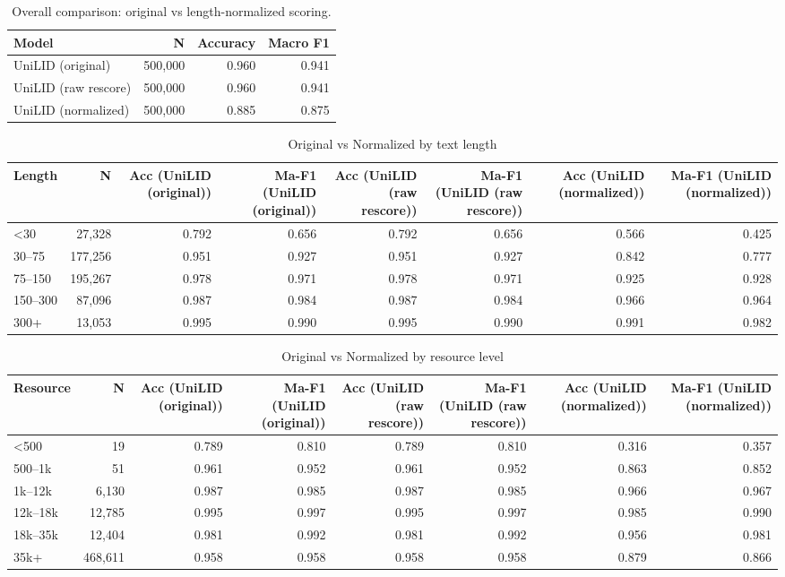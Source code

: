\begin{table}[htbp]
\centering
\small
\begin{tabular}{lrrr}
\toprule
\textbf{Model} & \textbf{N} & \textbf{Accuracy} & \textbf{Macro F1} \\
\midrule
UniLID (original) & 500,000 & 0.960 & 0.941 \\
UniLID (raw rescore) & 500,000 & 0.960 & 0.941 \\
UniLID (normalized) & 500,000 & 0.885 & 0.875 \\
\bottomrule
\end{tabular}
\caption{Overall comparison: original vs length-normalized scoring.}
\label{tab:norm-overall}
\end{table}

\begin{table}[htbp]
\centering
\small
\begin{tabular}{lrrrrrrr}
\toprule
\textbf{Length} & \textbf{N} & \textbf{Acc (UniLID (original))} & \textbf{Ma-F1 (UniLID (original))} & \textbf{Acc (UniLID (raw rescore))} & \textbf{Ma-F1 (UniLID (raw rescore))} & \textbf{Acc (UniLID (normalized))} & \textbf{Ma-F1 (UniLID (normalized))} \\
\midrule
<30 & 27,328 & 0.792 & 0.656 & 0.792 & 0.656 & 0.566 & 0.425 \\
30--75 & 177,256 & 0.951 & 0.927 & 0.951 & 0.927 & 0.842 & 0.777 \\
75--150 & 195,267 & 0.978 & 0.971 & 0.978 & 0.971 & 0.925 & 0.928 \\
150--300 & 87,096 & 0.987 & 0.984 & 0.987 & 0.984 & 0.966 & 0.964 \\
300+ & 13,053 & 0.995 & 0.990 & 0.995 & 0.990 & 0.991 & 0.982 \\
\bottomrule
\end{tabular}
\caption{Original vs Normalized by text length}
\label{tab:norm-length}
\end{table}

\begin{table}[htbp]
\centering
\small
\begin{tabular}{lrrrrrrr}
\toprule
\textbf{Resource} & \textbf{N} & \textbf{Acc (UniLID (original))} & \textbf{Ma-F1 (UniLID (original))} & \textbf{Acc (UniLID (raw rescore))} & \textbf{Ma-F1 (UniLID (raw rescore))} & \textbf{Acc (UniLID (normalized))} & \textbf{Ma-F1 (UniLID (normalized))} \\
\midrule
<500 & 19 & 0.789 & 0.810 & 0.789 & 0.810 & 0.316 & 0.357 \\
500--1k & 51 & 0.961 & 0.952 & 0.961 & 0.952 & 0.863 & 0.852 \\
1k--12k & 6,130 & 0.987 & 0.985 & 0.987 & 0.985 & 0.966 & 0.967 \\
12k--18k & 12,785 & 0.995 & 0.997 & 0.995 & 0.997 & 0.985 & 0.990 \\
18k--35k & 12,404 & 0.981 & 0.992 & 0.981 & 0.992 & 0.956 & 0.981 \\
35k+ & 468,611 & 0.958 & 0.958 & 0.958 & 0.958 & 0.879 & 0.866 \\
\bottomrule
\end{tabular}
\caption{Original vs Normalized by resource level}
\label{tab:norm-resource}
\end{table}

